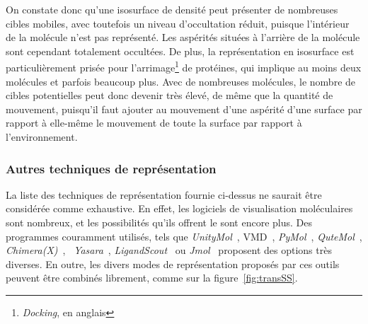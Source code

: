 \begin{appendices}
	
	On constate donc qu'une isosurface de densité peut présenter de nombreuses cibles mobiles, avec toutefois un niveau d'occultation réduit, puisque l'intérieur de la molécule n'est pas représenté. Les aspérités situées à \og l'arrière \fg{} de la molécule sont cependant totalement occultées. De plus, la représentation en isosurface est particulièrement prisée pour l'arrimage\footnote{\emph{Docking}, en anglais} de protéines, qui implique au moins deux molécules et parfois beaucoup plus. Avec de nombreuses molécules, le nombre de cibles potentielles peut donc devenir très élevé, de même que la quantité de mouvement, puisqu'il faut ajouter au mouvement d'une aspérité d'une surface par rapport à elle-même le mouvement de toute la surface par rapport à l'environnement.
	
	\subsubsection{Autres techniques de représentation}
	La liste des techniques de représentation fournie ci-dessus ne saurait être considérée comme exhaustive. En effet, les logiciels de visualisation moléculaires sont nombreux, et les possibilités qu'ils offrent le sont encore plus. Des programmes couramment utilisés, tels que \emph{UnityMol}~\cite{kouyoumdjian2013umol, kouyoumdjian2014game, doutreligne2014unitymol, martinez2017vizmol}, VMD~\cite{humphrey1996vmd}, \emph{PyMol}~\cite{delano2002pymol}, \emph{QuteMol}~\cite{tarini2006ambient, tarini2006qutemol}, \emph{Chimera(X)}~\cite{pettersen2004ucsf, goddard2017ucsf}, ~\emph{Yasara}~\cite{krieger2014yasara}, \emph{LigandScout}~\cite{wolber2005ligandscout} ou \emph{Jmol}~\cite{herraez2006biomolecules} proposent des options très diverses. En outre, les divers modes de représentation proposés par ces outils peuvent être combinés librement, comme sur la figure~\ref{fig:transSS}.
	

\end{appendices}

